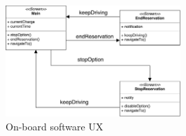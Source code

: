 \begin{figure}[H]
	\centerline{
		\includegraphics[width=250px]{../Datas/images/carDisplayUX.pdf}
	}
	\caption{On-board software UX}
	\label{fig:car-ux}
\end{figure}
